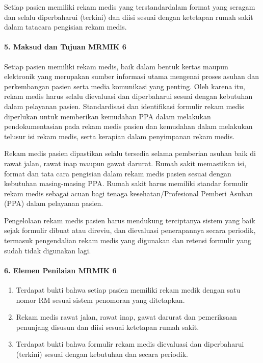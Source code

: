 \documentclass[
]{book}
\providecommand{\tightlist}{%
  \setlength{\itemsep}{0pt}\setlength{\parskip}{0pt}}
\begin{document}
Setiap pasien memiliki rekam medis yang terstandardalam format yang seragam dan selalu diperbaharui (terkini) dan diisi sesuai dengan ketetapan rumah sakit dalam tatacara pengisian rekam medis.

\hypertarget{maksud-dan-tujuan-mrmik-6}{%
\paragraph*{5. Maksud dan Tujuan MRMIK 6}\label{maksud-dan-tujuan-mrmik-6}}

Setiap pasien memiliki rekam medis, baik dalam bentuk kertas maupun elektronik yang merupakan sumber informasi utama mengenai proses asuhan dan perkembangan pasien serta media komunikasi yang penting. Oleh karena itu, rekam medis harus selalu dievaluasi dan diperbaharui sesuai dengan kebutuhan dalam pelayanan pasien. Standardisasi dan identifikasi formulir rekam medis diperlukan untuk memberikan kemudahan PPA dalam melakukan pendokumentasian pada rekam medis pasien dan kemudahan dalam melakukan telusur isi rekam medis, serta kerapian dalam penyimpanan rekam medis.

Rekam medis pasien dipastikan selalu tersedia selama pemberian asuhan baik di rawat jalan, rawat inap maupun gawat darurat. Rumah sakit memastikan isi, format dan tata cara pengisian dalam rekam medis pasien sesuai dengan kebutuhan masing-masing PPA. Rumah sakit harus memiliki standar formulir rekam medis sebagai acuan bagi tenaga kesehatan/Profesional Pemberi Asuhan (PPA) dalam pelayanan pasien.

Pengelolaan rekam medis pasien harus mendukung terciptanya sistem yang baik sejak formulir dibuat atau direviu, dan dievaluasi penerapannya secara periodik, termasuk pengendalian rekam medis yang digunakan dan retensi formulir yang sudah tidak digunakan lagi.

\hypertarget{elemen-penilaian-mrmik-6}{%
\paragraph*{6. Elemen Penilaian MRMIK 6}\label{elemen-penilaian-mrmik-6}}

\begin{enumerate}
\def\labelenumi{\alph{enumi}.}
\tightlist
\item
  Terdapat bukti bahwa setiap pasien memiliki rekam medik dengan satu nomor RM sesuai sistem penomoran yang ditetapkan.
\item
  Rekam medis rawat jalan, rawat inap, gawat darurat dan pemeriksaan penunjang disusun dan diisi sesuai ketetapan rumah sakit.
\item
  Terdapat bukti bahwa formulir rekam medis dievaluasi dan diperbaharui (terkini) sesuai dengan kebutuhan dan secara periodik.
\end{enumerate}
\end{document}
